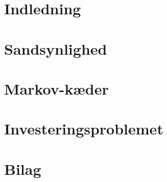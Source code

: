 

 




\chapter{Indledning} 
    

\chapter{Sandsynlighed}\label{kapitel:sandsynlighed}


%

\chapter{Markov-kæder}


\chapter{Investeringsproblemet}



\chapter{Bilag}
    


\cite{hoel1986introduction}
\cite{kaas2008modern}
\cite{oxford}



